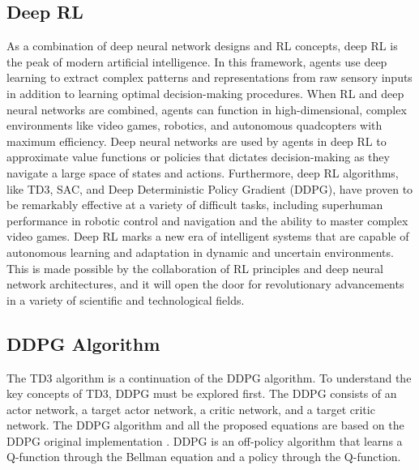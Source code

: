     \subsection{Deep RL}
    As a combination of deep neural network designs and RL concepts, deep RL is the peak of modern artificial intelligence. In this framework, agents use deep learning to extract complex patterns and representations from raw sensory inputs in addition to learning optimal decision-making procedures. When RL and deep neural networks are combined, agents can function in high-dimensional, complex environments like video games, robotics, and autonomous quadcopters with maximum efficiency. Deep neural networks are used by agents in deep RL to approximate value functions or policies that dictates decision-making as they navigate a large space of states and actions. Furthermore, deep RL algorithms, like TD3, SAC, and Deep Deterministic Policy Gradient (DDPG), have proven to be remarkably effective at a variety of difficult tasks, including superhuman performance in robotic control and navigation and the ability to master complex video games. Deep RL marks a new era of intelligent systems that are capable of autonomous learning and adaptation in dynamic and uncertain environments. This is made possible by the collaboration of RL principles and deep neural network architectures, and it will open the door for revolutionary advancements in a variety of scientific and technological fields.
    \subsection{DDPG Algorithm}
    The TD3 algorithm is a continuation of the DDPG algorithm. To understand the key concepts of TD3, DDPG must be explored first. The DDPG consists of an actor network, a target actor network, a critic network, and a target critic network.
    The DDPG algorithm and all the proposed equations are based on the DDPG original implementation \cite{silver2014deterministic} \cite{lillicrap2019continuous}. DDPG is an off-policy algorithm that learns a Q-function through the Bellman equation and a policy through the Q-function. \\
    
